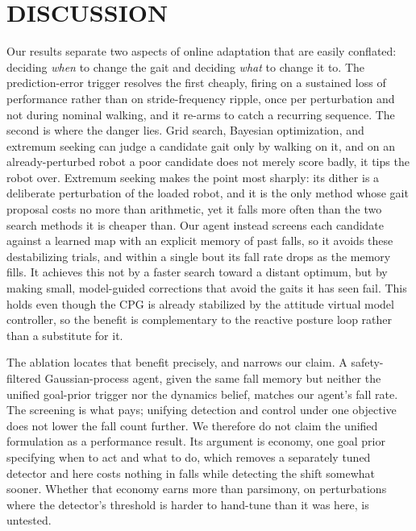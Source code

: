 \documentclass[letterpaper, 10 pt, conference]{ieeeconf}  %
\begin{document}
\section{DISCUSSION}

Our results separate two aspects of online adaptation that are easily conflated: deciding \emph{when} to change the gait and deciding \emph{what} to change it to.
The prediction-error trigger resolves the first cheaply, firing on a sustained loss of performance rather than on stride-frequency ripple, once per perturbation and not during nominal walking, and it re-arms to catch a recurring sequence.
The second is where the danger lies.
Grid search, Bayesian optimization, and extremum seeking can judge a candidate gait only by walking on it, and on an already-perturbed robot a poor candidate does not merely score badly, it tips the robot over.
Extremum seeking makes the point most sharply: its dither is a deliberate perturbation of the loaded robot, and it is the only method whose gait proposal costs no more than arithmetic, yet it falls more often than the two search methods it is cheaper than.
Our agent instead screens each candidate against a learned map with an explicit memory of past falls, so it avoids these destabilizing trials, and within a single bout its fall rate drops as the memory fills.
It achieves this not by a faster search toward a distant optimum, but by making small, model-guided corrections that avoid the gaits it has seen fail.
This holds even though the CPG is already stabilized by the attitude virtual model controller, so the benefit is complementary to the reactive posture loop rather than a substitute for it.

The ablation locates that benefit precisely, and narrows our claim.
A safety-filtered Gaussian-process agent, given the same fall memory but neither the unified goal-prior trigger nor the dynamics belief, matches our agent's fall rate.
The screening is what pays; unifying detection and control under one objective does not lower the fall count further.
We therefore do not claim the unified formulation as a performance result.
Its argument is economy, one goal prior specifying when to act and what to do, which removes a separately tuned detector and here costs nothing in falls while detecting the shift somewhat sooner.
Whether that economy earns more than parsimony, on perturbations where the detector's threshold is harder to hand-tune than it was here, is untested.
\end{document}
